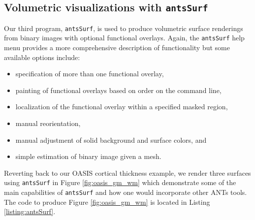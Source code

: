 \documentclass{InsightArticle}
\begin{document}
\subsection{Volumetric visualizations with {\tt antsSurf}}
Our third program, {\tt antsSurf}, is used to produce volumetric surface
renderings from binary images with optional functional overlays.  Again,
the {\tt antsSurf} help menu provides a more comprehensive description of
functionality but some available options include:
\begin{itemize}
  \item specification of more than one functional overlay,
  \item painting of functional overlays based on order on the command line,
  \item localization of the functional overlay within a specified masked region,
  \item manual reorientation,
  \item manual adjustment of solid background and surface colors, and
  \item simple estimation of binary image given a mesh.
\end{itemize}
Reverting back to our OASIS cortical thickness example, we render three surfaces
using {\tt antsSurf} in Figure \ref{fig:oasis_gm_wm} which demonstrate some of 
the main capabilities of {\tt antsSurf} and how one would incorporate other
ANTs tools.  The code to produce Figure \ref{fig:oasis_gm_wm} is located in 
Listing \ref{listing:antsSurf}.
\end{document}
